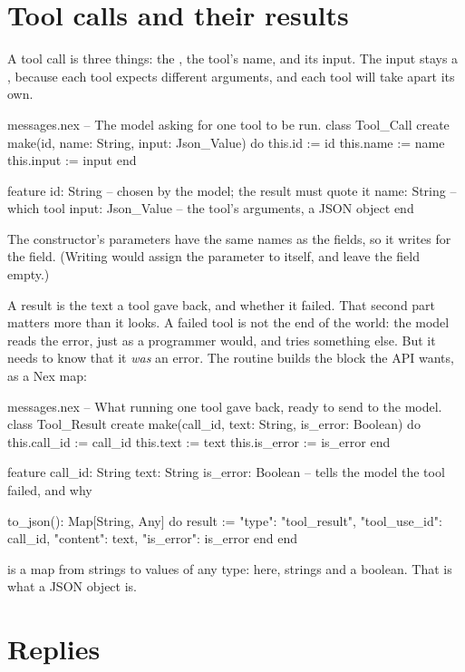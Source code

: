 \section{Tool calls and their results}

A tool call is three things: the , the tool's name, and its
input. The input stays a , because each tool expects
different arguments, and each tool will take apart its own.

\begin{append}{messages.nex}
-- The model asking for one tool to be run.
class Tool_Call
create
  make(id, name: String, input: Json_Value) do
    this.id := id
    this.name := name
    this.input := input
  end

feature
  id: String          -- chosen by the model; the result must quote it
  name: String        -- which tool
  input: Json_Value   -- the tool's arguments, a JSON object
end
\end{append}

The constructor's parameters have the same names as the fields, so it
writes  for the field. (Writing  would assign
the parameter to itself, and leave the field empty.)

A result is the text a tool gave back, and whether it failed. That second
part matters more than it looks. A failed tool is not the end of the
world: the model reads the error, just as a programmer would, and tries
something else. But it needs to know that it \emph{was} an error. The
 routine builds the block the API wants, as a Nex map:

\begin{append}{messages.nex}
-- What running one tool gave back, ready to send to the model.
class Tool_Result
create
  make(call_id, text: String, is_error: Boolean) do
    this.call_id := call_id
    this.text := text
    this.is_error := is_error
  end

feature
  call_id: String
  text: String
  is_error: Boolean   -- tells the model the tool failed, and why

  to_json(): Map[String, Any] do
    result := {"type": "tool_result", "tool_use_id": call_id,
      "content": text, "is_error": is_error}
  end
end
\end{append}

 is a map from strings to values of any type: here,
strings and a boolean. That is what a JSON object is.

\section{Replies}

